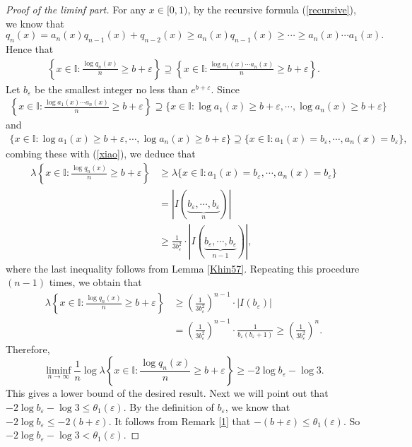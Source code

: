\documentclass[reqno]{amsart}
\theoremstyle{definition}
\numberwithin{equation}{section}
\begin{document}
\begin{proof}[Proof of the liminf part]
For any $x \in [0,1)$, by the recursive formula (\ref{recursive}), we know that
\begin{equation*}
q_n(x)= a_n(x) q_{n-1}(x) + q_{n-2}(x) \geq a_n(x) q_{n-1}(x)\geq \cdots \geq a_n(x)\cdots a_1(x).
\end{equation*}
Hence that
\begin{align}\label{xiao}
\left\{x \in \mathbb{I}: \frac{\log q_n(x)}{n} \geq b + \varepsilon\right\} \supseteq
\left\{x \in \mathbb{I}:\frac{\log a_1(x) \cdots a_n(x)}{n} \geq b + \varepsilon\right\}.
\end{align}
Let $b_\varepsilon$ be the smallest integer no less than $e^{b+\varepsilon}$.
Since
\begin{align*}
\left\{x \in \mathbb{I}:\frac{\log a_1(x) \cdots a_n(x)}{n} \geq b + \varepsilon\right\} \supseteq
 \Big\{x \in \mathbb{I}: \log a_1(x) \geq b + \varepsilon, \cdots, \log a_n(x) \geq b + \varepsilon\Big\}
\end{align*}
and
\begin{align*}
\Big\{x \in \mathbb{I}: \log a_1(x) \geq b + \varepsilon, \cdots, \log a_n(x) \geq b + \varepsilon\Big\} \supseteq
\Big\{x \in \mathbb{I}:a_1(x) = b_\varepsilon, \cdots, a_n(x)= b _\varepsilon\Big\},
\end{align*}
combing these with (\ref{xiao}), we deduce that
\begin{align*}
\lambda\left\{x \in \mathbb{I}:\frac{\log q_n(x)}{n} \geq b+ \varepsilon\right\}
&\geq  \lambda \big\{x \in \mathbb{I}:a_1(x) = b_\varepsilon, \cdots, a_n(x)= b _\varepsilon\big\} \\
&= |I(\underbrace{b_\varepsilon, \cdots,b_\varepsilon}_{n})| \\
& \geq \frac{1}{3b_\varepsilon^2} \cdot |I(\underbrace{b_\varepsilon, \cdots,b_\varepsilon}_{n-1})|,
\end{align*}
where the last inequality follows from Lemma \ref{Khin57}. Repeating this procedure $(n-1)$ times, we obtain that
\begin{align*}
\lambda\left\{x \in \mathbb{I}:\frac{\log q_n(x)}{n}  \geq b+ \varepsilon\right\} &\geq \left(\frac{1}{3b_\varepsilon^2}\right)^{n-1} \cdot |I(b_\varepsilon)| \\
&= \left(\frac{1}{3b_\varepsilon^2}\right)^{n-1} \cdot \frac{1}{b_\varepsilon(b_\varepsilon+1)} \geq \left(\frac{1}{3b_\varepsilon^2}\right)^{n}.
\end{align*}
Therefore,
\[
\liminf_{n \to \infty} \frac{1}{n}\log \lambda \left\{x \in \mathbb{I}:\frac{\log q_n(x)}{n} \geq  b+ \varepsilon\right\} \geq - 2\log b_\varepsilon -\log 3.
\]
This gives a lower bound of the desired result. Next we will point out that $- 2\log b_\varepsilon - \log 3 \leq \theta_1(\varepsilon)$. By the definition of $b_\varepsilon$, we know that $- 2\log b_\varepsilon \leq -2(b+\varepsilon)$.
It follows from Remark \ref{1} that $-(b+\varepsilon) \leq \theta_1(\varepsilon)$. So $- 2\log b_\varepsilon-\log 3 < \theta_1(\varepsilon)$.
\end{proof}
\end{document}
